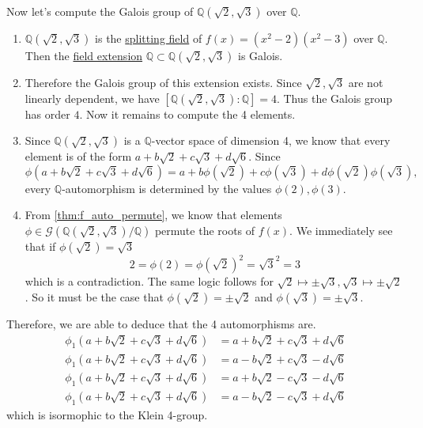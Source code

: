   \begin{example}
    \label{ex:computing-galois-groups}
    Now let's compute the Galois group of $\mathbb{Q}(\sqrt{2}, \sqrt{3})$ over $\mathbb{Q}$. 
    \begin{enumerate}
      \item $\mathbb{Q}(\sqrt{2}, \sqrt{3})$ is the \hyperref[def:splitting-field]{splitting field} of $f(x) = (x^2 - 2)(x^2 - 3)$ over $\mathbb{Q}$. Then the \hyperref[def:field-extension]{field extension} $\mathbb{Q} \subset \mathbb{Q}(\sqrt{2}, \sqrt{3})$ is Galois. 

      \item Therefore the Galois group of this extension exists. Since $\sqrt{2}, \sqrt{3}$ are not linearly dependent, we have $[\mathbb{Q}(\sqrt{2}, \sqrt{3}):\mathbb{Q}] = 4$. Thus the Galois group has order $4$. Now it remains to compute the 4 elements. 

      \item Since $\mathbb{Q}(\sqrt{2}, \sqrt{3})$ is a $\mathbb{Q}$-vector space of dimension 4, we know that every element is of the form $a + b \sqrt{2} + c \sqrt{3} + d \sqrt{6}$. Since 
      \begin{equation}
        \phi(a + b \sqrt{2} + c \sqrt{3} + d \sqrt{6}) = a + b \phi(\sqrt{2}) + c \phi(\sqrt{3}) + d \phi(\sqrt{2}) \phi(\sqrt{3}), 
      \end{equation}
      every $\mathbb{Q}$-automorphism is determined by the values $\phi(2), \phi(3)$. 

    \item From \ref{thm:f_auto_permute}, we know that elements $\phi \in \mathcal{G}(\mathbb{Q}(\sqrt{2}, \sqrt{3}) / \mathbb{Q})$ permute the roots of $f(x)$. We immediately see that if $\phi(\sqrt{2}) = \sqrt{3}$
      \begin{equation}
        2 = \phi(2) = \phi(\sqrt{2})^2 = \sqrt{3}^2 = 3
      \end{equation}
      which is a contradiction. The same logic follows for $\sqrt{2} \mapsto \pm \sqrt{3}, \sqrt{3} \mapsto \pm \sqrt{2}$. So it must be the case that $\phi(\sqrt{2}) = \pm \sqrt{2}$ and $\phi(\sqrt{3}) = \pm \sqrt{3}$. 
    \end{enumerate}
    Therefore, we are able to deduce that the 4 automorphisms are. 
    \begin{align}
      \phi_1 (a + b \sqrt{2} + c \sqrt{3} + d \sqrt{6}) & = a + b \sqrt{2} + c \sqrt{3} + d \sqrt{6} \\
      \phi_1 (a + b \sqrt{2} + c \sqrt{3} + d \sqrt{6}) & = a - b \sqrt{2} + c \sqrt{3} - d \sqrt{6} \\
      \phi_1 (a + b \sqrt{2} + c \sqrt{3} + d \sqrt{6}) & = a + b \sqrt{2} - c \sqrt{3} - d \sqrt{6} \\
      \phi_1 (a + b \sqrt{2} + c \sqrt{3} + d \sqrt{6}) & = a - b \sqrt{2} - c \sqrt{3} + d \sqrt{6}
    \end{align}
    which is isormophic to the Klein 4-group. 
  \end{example}

